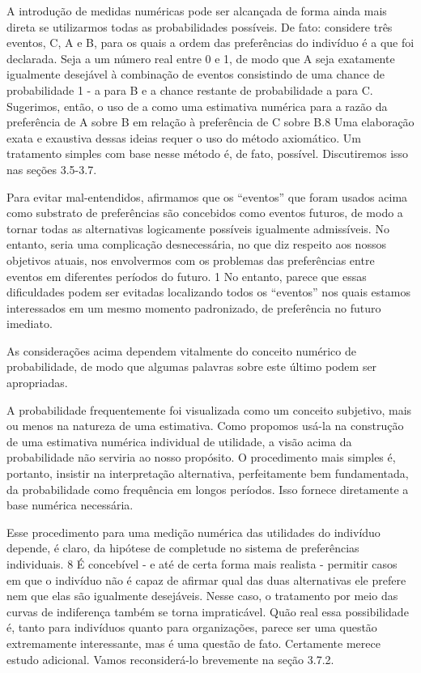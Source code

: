 \documentclass[a4paper,12pt]{article}[abntex2]
\begin{document}
A introdução de medidas numéricas pode ser alcançada de forma ainda mais direta se utilizarmos todas as probabilidades possíveis. De fato: considere três eventos, C, A e B, para os quais a ordem das preferências do indivíduo é a que foi declarada. Seja a um número real entre 0 e 1, de modo que A seja exatamente igualmente desejável à combinação de eventos consistindo de uma chance de probabilidade 1 - a para B e a chance restante de probabilidade a para C. Sugerimos, então, o uso de a como uma estimativa numérica para a razão da preferência de A sobre B em relação à preferência de C sobre B.8 Uma elaboração exata e exaustiva dessas ideias requer o uso do método axiomático. Um tratamento simples com base nesse método é, de fato, possível. Discutiremos isso nas seções 3.5-3.7.

Para evitar mal-entendidos, afirmamos que os “eventos” que foram usados acima como substrato de preferências são concebidos como eventos futuros, de modo a tornar todas as alternativas logicamente possíveis igualmente admissíveis. No entanto, seria uma complicação desnecessária, no que diz respeito aos nossos objetivos atuais, nos envolvermos com os problemas das preferências entre eventos em diferentes períodos do futuro. 1 No entanto, parece que essas dificuldades podem ser evitadas localizando todos os “eventos” nos quais estamos interessados em um mesmo momento padronizado, de preferência no futuro imediato.

As considerações acima dependem vitalmente do conceito numérico de probabilidade, de modo que algumas palavras sobre este último podem ser apropriadas.

A probabilidade frequentemente foi visualizada como um conceito subjetivo, mais ou menos na natureza de uma estimativa. Como propomos usá-la na construção de uma estimativa numérica individual de utilidade, a visão acima da probabilidade não serviria ao nosso propósito. O procedimento mais simples é, portanto, insistir na interpretação alternativa, perfeitamente bem fundamentada, da probabilidade como frequência em longos períodos. Isso fornece diretamente a base numérica necessária.

Esse procedimento para uma medição numérica das utilidades do indivíduo depende, é claro, da hipótese de completude no sistema de preferências individuais. 8 É concebível - e até de certa forma mais realista - permitir casos em que o indivíduo não é capaz de afirmar qual das duas alternativas ele prefere nem que elas são igualmente desejáveis. Nesse caso, o tratamento por meio das curvas de indiferença também se torna impraticável.
Quão real essa possibilidade é, tanto para indivíduos quanto para organizações, parece ser uma questão extremamente interessante, mas é uma questão de fato. Certamente merece estudo adicional. Vamos reconsiderá-lo brevemente na seção 3.7.2.
\end{document}

